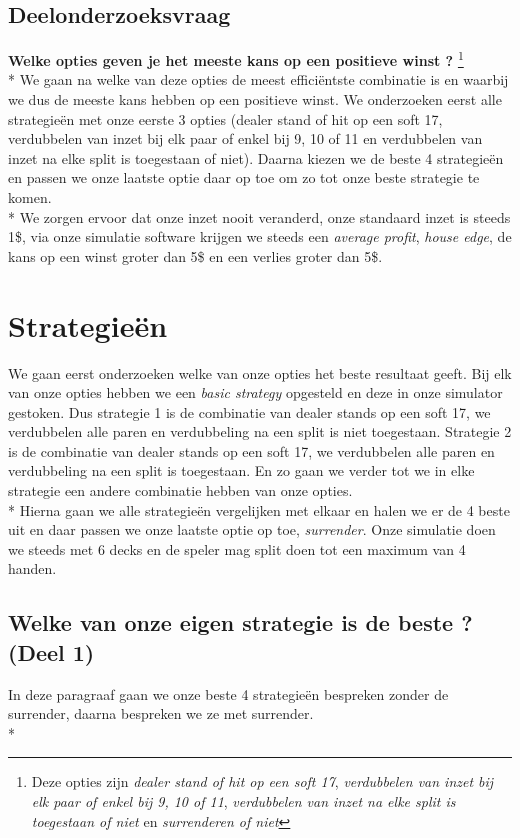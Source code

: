 \documentclass[conference]{IEEEtran}
\begin{document}
\subsection{Deelonderzoeksvraag} 
\textbf{Welke opties geven je het meeste kans op een positieve winst ?} 
\footnote{ Deze opties zijn {\it dealer stand of hit op een soft 17}, {\it verdubbelen van inzet bij elk paar of enkel bij 9, 10 of 11},
    {\it verdubbelen van inzet na elke split is toegestaan of niet} en {\it surrenderen of niet}}\\*
We gaan na welke van deze opties de meest effici\"entste combinatie is en waarbij we dus de meeste kans hebben op een positieve winst.
We onderzoeken eerst alle strategie\"en met onze eerste 3 opties (dealer stand of hit op een soft 17, verdubbelen van inzet bij elk paar of enkel bij 9, 10 of 11 en verdubbelen van inzet na elke split is toegestaan of niet). Daarna kiezen we de beste 4 strategie\"en en passen we onze laatste optie daar op toe om zo tot onze beste strategie te komen. \\*
We zorgen ervoor dat onze inzet nooit veranderd, onze standaard inzet is steeds 1\$, via onze simulatie software krijgen we steeds een \textit{average profit}, \textit{house edge}, de kans op een winst groter dan 5\$ en een verlies groter dan 5\$. 

\newpage

\section{Strategie\"en}
We gaan eerst onderzoeken welke van onze opties het beste resultaat geeft. Bij elk van onze opties hebben we een \textit{basic strategy}
opgesteld en deze in onze simulator gestoken. Dus strategie 1 is de combinatie van dealer stands op een soft 17, we verdubbelen alle paren en
verdubbeling na een split is niet toegestaan. Strategie 2 is de combinatie van dealer stands op een soft 17, we verdubbelen alle paren en
verdubbeling na een split is toegestaan. En zo gaan we verder tot we in elke strategie een andere combinatie hebben van onze opties.\\*
Hierna gaan we alle strategie\"en vergelijken met elkaar en halen we er de 4 beste uit en daar passen we onze laatste optie op toe, \textit{surrender}. Onze simulatie doen we steeds met 6 decks en de speler mag split doen tot een maximum van 4 handen.

\subsection{Welke van onze eigen strategie is de beste ? (Deel 1)}
In deze paragraaf gaan we onze beste 4 strategie\"en bespreken zonder de surrender, daarna bespreken we ze met surrender.\\*
\end{document}
